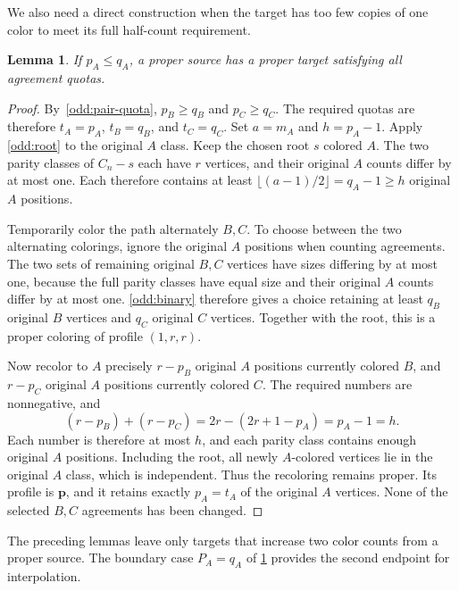 \documentclass[11pt,reqno]{amsart}
\numberwithin{equation}{section}
\newtheorem{lemma}[theorem]{Lemma}
\theoremstyle{definition}
\theoremstyle{remark}
\begin{document}
We also need a direct construction when the target has too few copies
of one color to meet its full half-count requirement.

\begin{lemma}\label{odd:lower}
If $p_A\le q_A$, a proper source has a proper target satisfying all
agreement quotas.
\end{lemma}
\begin{proof}
By~\eqref{odd:pair-quota}, $p_B\ge q_B$ and $p_C\ge q_C$.
The required quotas are therefore $t_A=p_A$, $t_B=q_B$, and $t_C=q_C$.
Set $a=m_A$ and $h=p_A-1$.
Apply \cref{odd:root} to the original $A$ class. Keep the chosen
root $s$ colored $A$. The two parity classes of $C_n-s$ each have
$r$ vertices, and their original $A$ counts differ by at most one.
Each therefore contains at least
$\lfloor(a-1)/2\rfloor=q_A-1\ge h$ original $A$ positions.

Temporarily color the path alternately $B,C$. To choose between the
two alternating colorings, ignore the original $A$ positions when counting
agreements. The two sets of remaining original $B,C$ vertices have
sizes differing by at most one, because the full parity classes have
equal size and their original $A$ counts differ by at most one.
\cref{odd:binary} therefore gives a choice retaining at
least $q_B$ original $B$ vertices and $q_C$ original $C$ vertices.
Together with the root, this is a proper coloring of profile $(1,r,r)$.

Now recolor to $A$ precisely $r-p_B$ original $A$ positions currently
colored $B$, and $r-p_C$ original $A$ positions currently colored $C$.
The required numbers are nonnegative, and
\[
(r-p_B)+(r-p_C)
=2r-(2r+1-p_A)=p_A-1=h.
\]
Each number is therefore at most $h$, and each parity class contains
enough original $A$ positions. Including the root, all newly
$A$-colored vertices lie in the original $A$ class, which is
independent. Thus the recoloring remains proper. Its profile is
$\mathbf p$, and it retains exactly $p_A=t_A$ of the original $A$ vertices.
None of the selected $B,C$ agreements has been changed.
\end{proof}

The preceding lemmas leave only targets that increase two color counts
from a proper source. The boundary case $P_A=q_A$ of \cref{odd:lower}
provides the second endpoint for interpolation.
\end{document}
